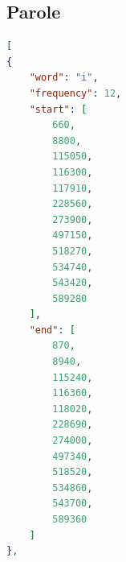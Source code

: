 \documentclass[12pt,a4paper,titlepage]{article}
\begin{document}
\subsection{Parole}
\label{subsec:parole}

\begin{lstlisting}[language=json,firstnumber=1, caption=Formato JSON delle parole allineate, label=JSON_parole,captionpos=b]
[
{
	"word": "i",
	"frequency": 12,
	"start": [
		660,
		8800,
		115050,
		116300,
		117910,
		228560,
		273900,
		497150,
		518270,
		534740,
		543420,
		589280
	],
	"end": [
		870,
		8940,
		115240,
		116360,
		118020,
		228690,
		274000,
		497340,
		518520,
		534860,
		543700,
		589360
	]
},
\end{lstlisting}

\clearpage
\nocite{*}
\printbibliography
\end{document}
